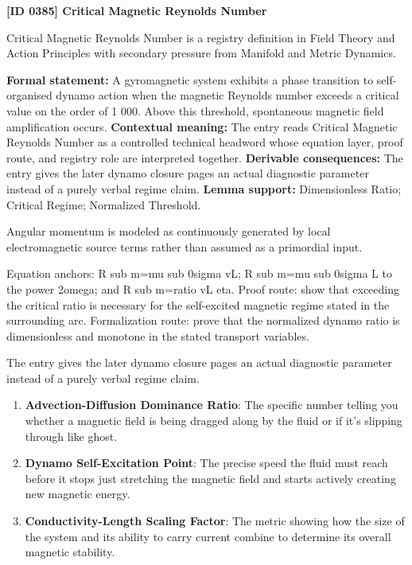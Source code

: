 \clearpage
\noindent\textbf{[ID 0385] Critical Magnetic Reynolds Number}\par
\vspace{0.35em}
\begingroup\small
{}
Critical Magnetic Reynolds Number is a registry definition in Field Theory and Action Principles with secondary pressure from Manifold and Metric Dynamics.

\begingroup\footnotesize\setlength{\emergencystretch}{3em}\sloppy
\textbf{Formal statement:} A gyromagnetic system exhibits a phase transition to self-organised dynamo action when the magnetic Reynolds number exceeds a critical value on the order of 1 000. Above this threshold, spontaneous magnetic field amplification occurs. \textbf{Contextual meaning:} The entry reads Critical Magnetic Reynolds Number as a controlled technical headword whose equation layer, proof route, and registry role are interpreted together. \textbf{Derivable consequences:} The entry gives the later dynamo closure pages an actual diagnostic parameter instead of a purely verbal regime claim. \textbf{Lemma support:} Dimensionless Ratio; Critical Regime; Normalized Threshold.\par
\endgroup

Angular momentum is modeled as continuously generated by local electromagnetic source terms rather than assumed as a primordial input.

Equation anchors: R sub m=mu sub 0sigma vL; R sub m=mu sub 0sigma L to the power 2omega; and R sub m=ratio vL eta. Proof route: show that exceeding the critical ratio is necessary for the self-excited magnetic regime stated in the surrounding arc. Formalization route: prove that the normalized dynamo ratio is dimensionless and monotone in the stated transport variables.

The entry gives the later dynamo closure pages an actual diagnostic parameter instead of a purely verbal regime claim.
\endgroup

\begin{enumerate}[leftmargin=1.6em,itemsep=6pt,topsep=4pt]
\item \textbf{Advection-Diffusion Dominance Ratio}: The specific number telling you whether a magnetic field is being dragged along by the fluid or if it's slipping through like ghost.
\item \textbf{Dynamo Self-Excitation Point}: The precise speed the fluid must reach before it stops just stretching the magnetic field and starts actively creating new magnetic energy.
\item \textbf{Conductivity-Length Scaling Factor}: The metric showing how the size of the system and its ability to carry current combine to determine its overall magnetic stability.
\end{enumerate}

